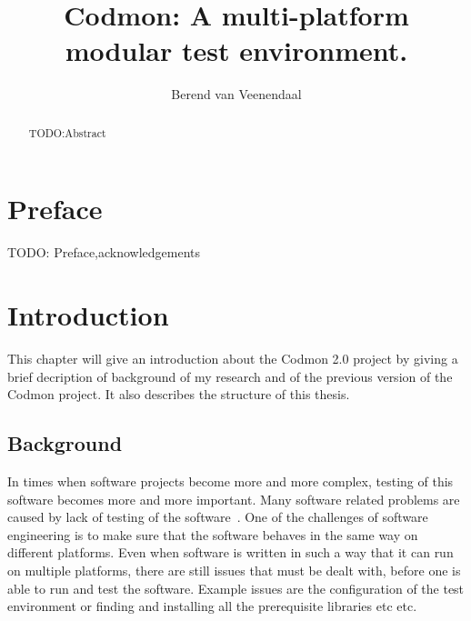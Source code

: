 \documentclass[a4paper,10pt]{scrartcl}
\title{Codmon: A multi-platform modular test environment.}
\author{Berend van Veenendaal}
\newcommand{\project}{Codmon 2.0}
\begin{document}
\maketitle

\begin{abstract}
TODO:Abstract
\end{abstract}
\newpage
\section*{Preface}
\label{sec:Preface}
TODO: Preface,acknowledgements
\newpage
\tableofcontents
\newpage

\section{Introduction}
\label{sec:Introduction}
This chapter will give an introduction about the \project{} project by giving a brief decription of background of my research and of the
previous version of the Codmon project. It also describes the structure of this thesis.

\subsection{Background}
\label{sec:Background}
In times when software projects become more and more complex, testing of this software becomes more and more important. Many software
related problems are caused by lack of testing of the software~\cite{TTCST}. One of the challenges of software engineering is to make
sure that the software behaves in the same way on different platforms. Even when software is written in such a way that it can run on multiple platforms, there 
are still issues that must be dealt with, before one is able to run and test the software. Example issues are the configuration of the test environment 
or finding and installing all the prerequisite libraries etc etc. 
\end{document}
